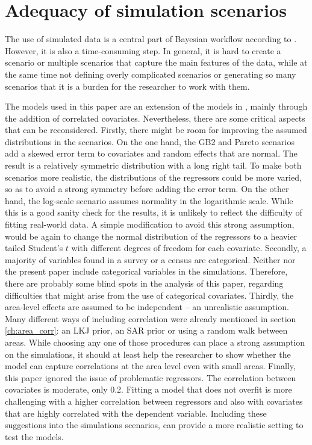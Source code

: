 \section{Adequacy of simulation scenarios}
\label{ch:adequacy_simulations}

The use of simulated data is a central part of Bayesian workflow according to \cite{gelman_bayesian_2020}.
However, it is also a time-consuming step.
In general, it is hard to create a scenario or multiple scenarios that capture the main features of the data, while at the same time not defining overly complicated scenarios or generating so many scenarios that it is a burden for the researcher to work with them.

The models used in this paper are an extension of the models in \cite{rojas_perilla_data_2020}, mainly through the addition of correlated covariates.
Nevertheless, there are some critical aspects that can be reconsidered.
Firstly, there might be room for improving the assumed distributions in the scenarios.
On the one hand, the GB2 and Pareto scenarios add a skewed error term to covariates and random effects that are normal.
The result is a relatively symmetric distribution with a long right tail.
To make both scenarios more realistic, the distributions of the regressors could be more varied, so as to avoid a strong symmetry before adding the error term.
On the other hand, the log-scale scenario assumes normality in the logarithmic scale.
While this is a good sanity check for the results, it is unlikely to reflect the difficulty of fitting real-world data.
A simple modification to avoid this strong assumption, would be again to change the normal distribution of the regressors to a heavier tailed Student's $t$ with different degrees of freedom for each covariate.
Secondly, a majority of variables found in a survey or a census are categorical.
Neither \cite{rojas_perilla_data_2020} nor the present paper include categorical variables in the simulations.
Therefore, there are probably some blind spots in the analysis of this paper, regarding difficulties that might arise from the use of categorical covariates.
Thirdly, the area-level effects are assumed to be independent – an unrealistic assumption.
Many different ways of including correlation were already mentioned in section \ref{ch:area_corr}: an LKJ prior, an SAR prior or using a random walk between areas.
While choosing any one of those procedures can place a strong assumption on the simulations, it should at least help the researcher to show whether the model can capture correlations at the area level even with small areas.
Finally, this paper ignored the issue of problematic regressors.
The correlation between covariates is moderate, only 0.2.
Fitting a model that does not overfit is more challenging with a higher correlation between regressors and also with covariates that are highly correlated with the dependent variable.
Including these suggestions into the simulations scenarios, can provide a more realistic setting to test the models.

